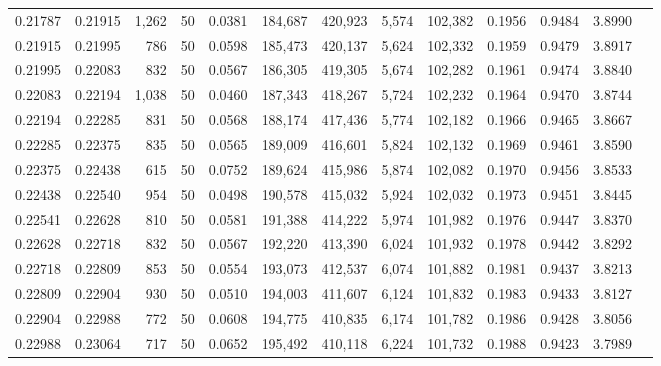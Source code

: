 \begin{tabular}{rrrrrrrrrrrrr}
0.21787 & 0.21915 & 1,262 &  50 &                                     0.0381 & 184,687 & 420,923 &   5,574 & 102,382 & 0.1956 & 0.9484 & 3.8990 \\
0.21915 & 0.21995 &   786 &  50 &                                     0.0598 & 185,473 & 420,137 &   5,624 & 102,332 & 0.1959 & 0.9479 & 3.8917 \\
0.21995 & 0.22083 &   832 &  50 &                                     0.0567 & 186,305 & 419,305 &   5,674 & 102,282 & 0.1961 & 0.9474 & 3.8840 \\
0.22083 & 0.22194 & 1,038 &  50 &                                     0.0460 & 187,343 & 418,267 &   5,724 & 102,232 & 0.1964 & 0.9470 & 3.8744 \\
0.22194 & 0.22285 &   831 &  50 &                                     0.0568 & 188,174 & 417,436 &   5,774 & 102,182 & 0.1966 & 0.9465 & 3.8667 \\
0.22285 & 0.22375 &   835 &  50 &                                     0.0565 & 189,009 & 416,601 &   5,824 & 102,132 & 0.1969 & 0.9461 & 3.8590 \\
0.22375 & 0.22438 &   615 &  50 &                                     0.0752 & 189,624 & 415,986 &   5,874 & 102,082 & 0.1970 & 0.9456 & 3.8533 \\
0.22438 & 0.22540 &   954 &  50 &                                     0.0498 & 190,578 & 415,032 &   5,924 & 102,032 & 0.1973 & 0.9451 & 3.8445 \\
0.22541 & 0.22628 &   810 &  50 &                                     0.0581 & 191,388 & 414,222 &   5,974 & 101,982 & 0.1976 & 0.9447 & 3.8370 \\
0.22628 & 0.22718 &   832 &  50 &                                     0.0567 & 192,220 & 413,390 &   6,024 & 101,932 & 0.1978 & 0.9442 & 3.8292 \\
0.22718 & 0.22809 &   853 &  50 &                                     0.0554 & 193,073 & 412,537 &   6,074 & 101,882 & 0.1981 & 0.9437 & 3.8213 \\
0.22809 & 0.22904 &   930 &  50 &                                     0.0510 & 194,003 & 411,607 &   6,124 & 101,832 & 0.1983 & 0.9433 & 3.8127 \\
0.22904 & 0.22988 &   772 &  50 &                                     0.0608 & 194,775 & 410,835 &   6,174 & 101,782 & 0.1986 & 0.9428 & 3.8056 \\
0.22988 & 0.23064 &   717 &  50 &                                     0.0652 & 195,492 & 410,118 &   6,224 & 101,732 & 0.1988 & 0.9423 & 3.7989 \\

\end{tabular}
